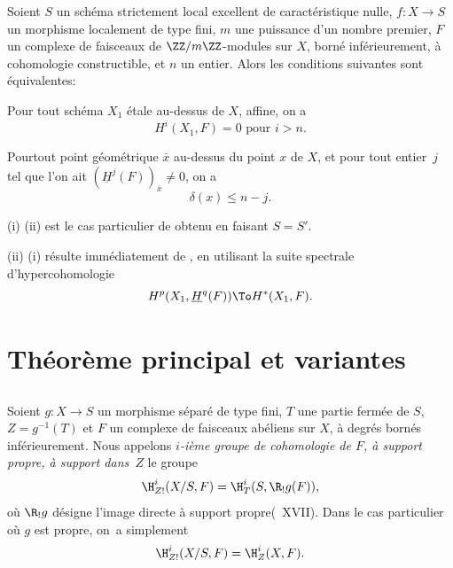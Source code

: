 \begin{corollaire} \label{XIV.3.7}
Soient $S$ un sch\'ema strictement local excellent de caract\'eristique nulle, $f:X \to S$ un morphisme localement de type fini, $m$ une puissance d'un nombre premier, $F$ un complexe de faisceaux de $\ZZ/m\ZZ$-modules sur $X$, born\'e inf\'erieurement, \`a cohomologie constructible, et $n$ un entier. Alors les conditions suivantes sont \'equivalentes:
\begin{enumeratei}
\item
Pour tout sch\'ema $X_1$ \'etale au-dessus de $X$, affine, on a
$$
H^i(X_1, F)=0\text{ pour }i>n.
$$

\item
Pour\pageoriginale tout point g\'eom\'etrique $\bar{x}$ au-dessus du point $x$ de $X$, et pour tout entier~$j$ tel que l'on ait $(\underline{H}^j(F))_{\bar{x}} \neq 0$, on a
$$
\delta(x) \leq n-j.
$$
\end{enumeratei}
\end{corollaire}

\textup{(i)} \ALORS \textup{(ii)} est le cas particulier de  obtenu en faisant $S=S'$.

\textup{(ii)} \ALORS \textup{(i)} r\'esulte imm\'ediatement de , en utilisant la suite spectrale d'hypercohomologie
$$
H^p(X_1, \underline{H}^q(F)) \To H^*(X_1, F).
$$

\section{Th\'eor\`eme principal et variantes} \label{XIV.4}

\setcounter{subsection}{-1}

\subsection{} \label{XIV.4.0}
Soient $g\colon X\to S$ un morphisme s\'epar\'e de type fini, $T$ une partie ferm\'ee de $S$, \hbox{$Z=g^{-1}(T)$} et $F$ un complexe de faisceaux ab\'eliens sur $X$, \`a degr\'es born\'es inf\'erieurement. Nous appelons \emph{$i$-i\`eme groupe de cohomologie de $F$, \`a support propre, \`a support dans~$Z$} le groupe
$$
\H_{Z!}^{i}(X/S, F)=\H_{T}^{i}(S, \R_{!}g(F)),
$$
o\`u $\R_{!}g$ d\'esigne \og l'image directe \`a support propre\fg (~XVII). Dans le cas particulier o\`u $g$ est propre, on~a simplement
$$
\H_{Z!}^{i}(X/S, F)=\H_{Z}^{i}(X, F).
$$

